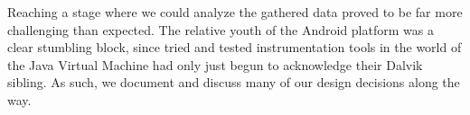 Reaching a stage where we could analyze the gathered data proved to be far more challenging than expected. The relative youth of the Android platform was a clear stumbling block, since tried and tested instrumentation tools in the world of the Java Virtual Machine had only just begun to acknowledge their Dalvik sibling. As such, we document and discuss many of our design decisions along the way.


